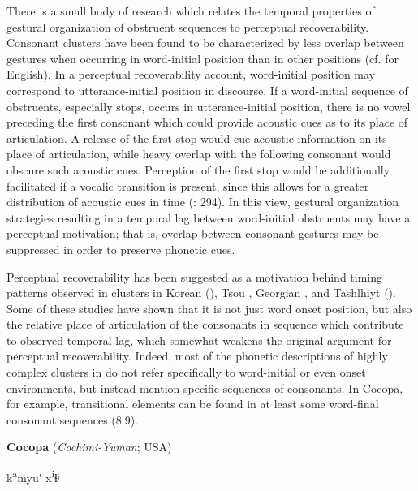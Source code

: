  There is a small body of research which relates the temporal properties of gestural organization of obstruent sequences to perceptual recoverability. Consonant clusters have been found to be characterized by less overlap between gestures when occurring in word-initial position than in other positions (cf. \citealt{Byrd1996a} for English). In a perceptual recoverability account, word-initial position may correspond to utterance-initial position in discourse. If a word-initial sequence of obstruents, especially stops, occurs in utterance-initial position, there is no vowel preceding the first consonant which could provide acoustic cues as to its place of articulation. A release of the first stop would cue acoustic information on its place of articulation, while heavy overlap with the following consonant would obscure such acoustic cues. Perception of the first stop would be additionally facilitated if a vocalic transition is present, since this allows for a greater distribution of acoustic cues in time (\citealt{RidouaneFougeron2011}: 294). In this view, gestural organization strategies resulting in a temporal lag between word-initial obstruents may have a perceptual motivation; that is, overlap between consonant gestures may be suppressed in order to preserve phonetic cues.



  Perceptual recoverability has been suggested as a motivation behind timing patterns observed in clusters in Korean (\citealt{SilvermanJun1994}), Tsou \citep{Wright1996}, Georgian \citep{ChitoranEtAl2002}, and Tashlhiyt (\citealt{RidouaneFougeron2011}). Some of these studies have shown that it is not just word onset position, but also the relative place of articulation of the consonants in sequence which contribute to observed temporal lag, which somewhat weakens the original argument for perceptual recoverability. Indeed, most of the phonetic descriptions of highly complex clusters in  do not refer specifically to word-initial or even onset environments, but instead mention specific sequences of consonants. In Cocopa, for example, transitional elements can be found in at least some word-final consonant sequences (8.9).



\ea\label{ex:(8.9)}
  \textbf{Cocopa} (\textit{Cochimi-Yuman}; USA)



k\textsuperscript{a}myu\'{} x\textsuperscript{i}ɬʲ



